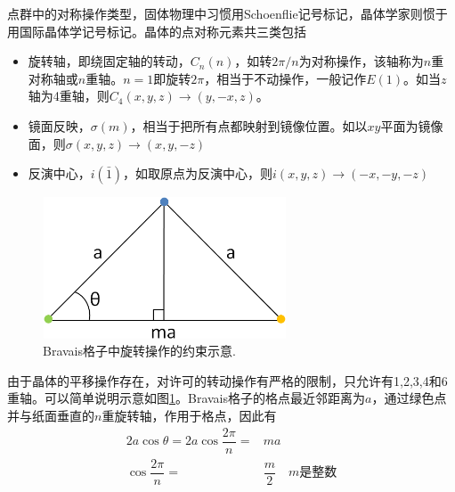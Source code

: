 点群中的对称操作类型，固体物理中习惯用Schoenflie记号标记，晶体学家则惯于用国际晶体学记号标记。晶体的点对称元素共三类包括
\begin{itemize}
	\item 旋转轴，即绕固定轴的转动，$C_n(n)$，如转$2\pi/n$为对称操作，该轴称为$n$重对称轴或$n$重轴。$n=1$即旋转$2\pi$，相当于不动操作，一般记作$E(1)$。如当$z$轴为4重轴，则$C_4(x,y,z)\rightarrow(y,-x,z)$。
	\item 镜面反映，$\sigma(m)$，相当于把所有点都映射到镜像位置。如以$xy$平面为镜像面，则$\sigma(x,y,z)\rightarrow(x,y,-z)$
	\item 反演中心，$i(\bar{1})$，如取原点为反演中心，则$i(x,y,z)\rightarrow(-x,-y,-z)$
\end{itemize}

\begin{figure}[h!]
\centering
\vspace*{-0.05in}
\includegraphics[height=1.65in,width=2.85in,viewport=0 0 510 297,clip]{Figures/Crystallographic_restriction_2.png}
\caption{\small \textrm{Bravais格子中旋转操作的约束示意.}}%
\label{Fig:Crystallographic_restriction}
\end{figure}
由于晶体的平移操作存在，对许可的转动操作有严格的限制，只允许有1,2,3,4和6重轴。可以简单说明示意如图\ref{Fig:Crystallographic_restriction}。Bravais格子的格点最近邻距离为$a$，通过绿色点并与纸面垂直的$n$重旋转轴，作用于格点，因此有
\begin{displaymath}
	\begin{aligned}
		2a\cos\theta=2a\cos\dfrac{2\pi}n=&ma\\
		\cos\dfrac{2\pi}n=&\dfrac{m}2\quad m\mbox{是整数}
	\end{aligned}
\end{displaymath}
